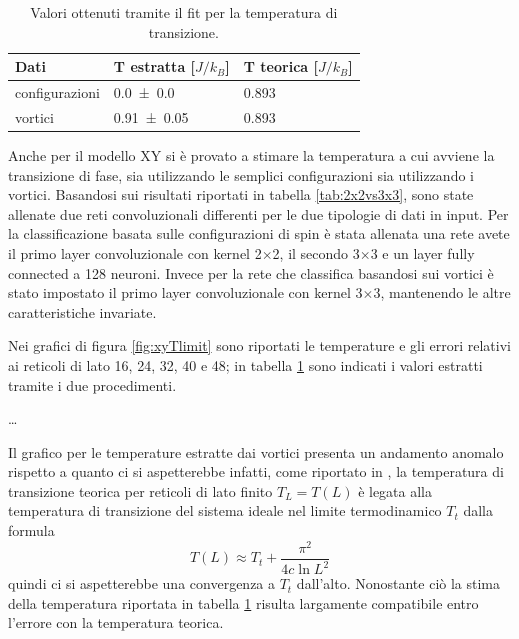 \documentclass{article}
\begin{document}
\begin{table}[!ht]
\begin{center}
\begin{tabular}{lll}
\toprule
Dati & T estratta [$J/k_B$] & T teorica [$J/k_B$] \\
\midrule
configurazioni & \num{ 0.0 \pm 0.0} & \num{0.893}\\
vortici & \num{0.91 \pm0.05}  & \num{0.893} \\
\bottomrule
\end{tabular}
\end{center}
\caption{Valori ottenuti tramite il fit per la temperatura di transizione.}
\label{tab:Txy}
\end{table}

Anche per il modello XY si è provato a stimare la temperatura a cui avviene la transizione di fase, sia utilizzando le semplici configurazioni sia utilizzando i vortici.
Basandosi sui risultati riportati in tabella \ref{tab:2x2vs3x3}, sono state allenate due reti convoluzionali differenti per le due tipologie di dati in input.
Per la classificazione basata sulle configurazioni di spin è stata allenata una rete avete il primo layer convoluzionale con kernel 2$\times$2, il secondo 3$\times$3 e un layer fully connected a 128 neuroni.
Invece per la rete che classifica basandosi sui vortici è stato impostato il primo layer convoluzionale con kernel 3$\times$3, mantenendo le altre caratteristiche invariate.

Nei grafici di figura \ref{fig:xyTlimit} sono riportati le temperature e gli errori relativi ai reticoli di lato 16, 24, 32, 40 e 48; in tabella \ref{tab:Txy} sono indicati i valori estratti tramite i due procedimenti.

\dots

Il grafico per le temperature estratte dai vortici presenta un andamento anomalo rispetto a quanto ci si aspetterebbe infatti, come riportato in \cite{melko}, la temperatura di transizione teorica per reticoli di lato finito $T_L=T(L)$ è legata alla temperatura di transizione del sistema ideale nel limite termodinamico $T_t$ dalla formula
\begin{equation}
T(L) \approx T_t + \frac{\pi^2}{4c \ln{L}^2}
\end{equation}
quindi ci si aspetterebbe una convergenza a $T_t$ dall'alto.
Nonostante ciò la stima della temperatura riportata in tabella \ref{tab:Txy} risulta largamente compatibile entro l'errore con la temperatura teorica.






\end{document}
